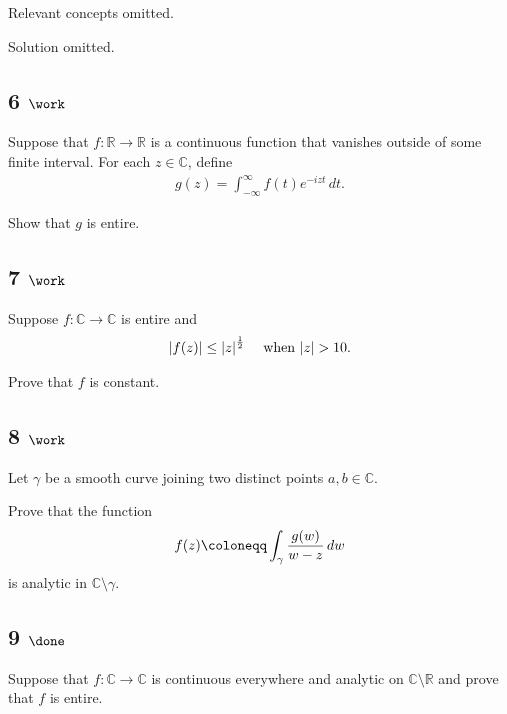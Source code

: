Relevant concepts omitted.

Solution omitted.

\hypertarget{work-20}{%
\subsection{\texorpdfstring{6
\(\work\)}{6 \textbackslash work}}\label{work-20}}

Suppose that \(f: {\mathbb{R}}\to{\mathbb{R}}\) is a continuous function
that vanishes outside of some finite interval. For each
\(z\in {\mathbb{C}}\), define
\begin{align*}
g(z) = \int_{-\infty}^\infty f(t) e^{-izt} \,dt
.\end{align*}

Show that \(g\) is entire.

\hypertarget{work-21}{%
\subsection{\texorpdfstring{7
\(\work\)}{7 \textbackslash work}}\label{work-21}}

Suppose \(f: {\mathbb{C}}\to {\mathbb{C}}\) is entire and
\begin{align*}
{\left\lvert {f(z)} \right\rvert} \leq {\left\lvert {z} \right\rvert}^{1\over 2} \quad\text{ when } {\left\lvert {z} \right\rvert} > 10
.\end{align*}

Prove that \(f\) is constant.

\hypertarget{work-22}{%
\subsection{\texorpdfstring{8
\(\work\)}{8 \textbackslash work}}\label{work-22}}

Let \(\gamma\) be a smooth curve joining two distinct points
\(a, b\in {\mathbb{C}}\).

Prove that the function
\begin{align*}
f(z) \coloneqq\int_\gamma {g(w) \over w-z} \,dw
\end{align*}
is analytic in \({\mathbb{C}}\setminus\gamma\).

\hypertarget{done-1}{%
\subsection{\texorpdfstring{9
\(\done\)}{9 \textbackslash done}}\label{done-1}}

Suppose that \(f: {\mathbb{C}}\to{\mathbb{C}}\) is continuous everywhere
and analytic on \({\mathbb{C}}\setminus {\mathbb{R}}\) and prove that
\(f\) is entire.

